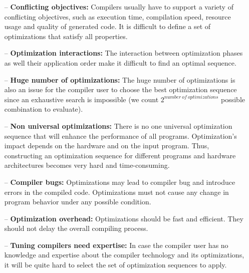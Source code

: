 \begin{itemize}
	\item[--] \textbf{Conflicting objectives:} Compilers usually have to support a variety of conflicting objectives, such as execution time, compilation speed, resource usage and quality of generated code. It is difficult to define a set of optimizations that satisfy all properties.
	
	\item[--] \textbf{Optimization interactions:} The interaction between optimization phases as well their application order make it difficult to find an optimal sequence.
	
	\item[--] \textbf{Huge number of optimizations:} The huge number of optimizations is also an issue for the compiler user to choose the best optimization sequence since an exhaustive search is impossible (we count $2^{number\ of\ optimizations}$ possible combination to evaluate).
	
	\item[--] \textbf{Non universal optimizations:} There is no one universal optimization sequence that will enhance the performance of all programs. Optimization's impact depends on the hardware and on the input program. Thus, constructing an optimization sequence for different programs and hardware architectures becomes very hard and time-consuming.
	
	\item[--] \textbf{Compiler bugs:} Optimizations may lead to compiler bug and introduce errors in the compiled code. Optimizations must not cause any change in program behavior under any possible condition\cite{le2014compiler,yang2011finding}.
	
	\item[--] \textbf{Optimization overhead:} Optimizations should be fast and efficient. They should not delay the overall compiling process.
	
	\item[--] \textbf{Tuning compilers need expertise:} In case the compiler user has no knowledge and expertise about the compiler technology and its optimizations, it will be quite hard to select the set of optimization sequences to apply.
\end{itemize}

 



